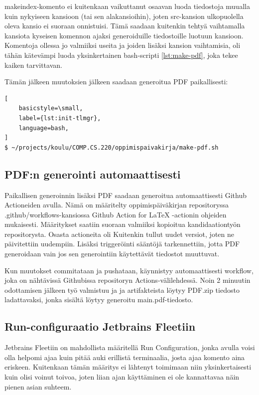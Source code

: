 makeindex-komento ei kuitenkaan vaikuttanut osaavan luoda tiedostoja muualla
kuin nykyiseen kansioon (tai sen alakansioihin), joten src-kansion ulkopuolella
oleva kansio ei suoraan onnistuisi. Tämä saadaan kuitenkin tehtyä vaihtamalla
kansiota kyseisen komennon ajaksi generoiduille tiedostoille luotuun kansioon.
Komentoja ollessa jo valmiiksi useita ja joiden lisäksi kansion vaihtamisia,
oli tähän kätevämpi luoda yksinkertainen bash-scripti \ref{lst:make-pdf}, joka
tekee kaiken tarvittavan.



Tämän jälkeen muutoksien jälkeen saadaan generoitua PDF paikallisesti:

\begin{lstlisting}[
    basicstyle=\small,
    label={lst:init-tlmgr},
    language=bash,
]
$ ~/projects/koulu/COMP.CS.220/oppimispaivakirja/make-pdf.sh
\end{lstlisting}

\subsection{PDF:n generointi automaattisesti}

Paikallisen generoinnin lisäksi PDF saadaan generoitua automaattisesti Github
Actioneiden avulla. Nämä on määritelty oppimispäiväkirjan repositoryssa
.github/workflows-kansiossa Github Action for LaTeX -actionin ohjeiden
\parencite{GithubActionsForLaTeX} mukaisesti. Määritykset saatiin suoraan
valmiiksi kopioitua kandidaationtyön repositorysta. Osasta actioneita oli
Kuitenkin tullut uudet versiot, joten ne päivitettiin uudempiin. Lisäksi
triggeröinti sääntöjä tarkennettiin, jotta PDF generoidaan vain jos sen
generointiin käytettävät tiedostot muuttuvat.

Kun muutokset commitataan ja pushataan, käynnistyy automaattisesti workflow,
joka on nähtävissä Githubissa repositoryn Actions-välilehdessä. Noin 2 minuutin
odottamisen jälkeen työ valmistuu ja ja artifakteista löytyy PDF.zip tiedosto
ladattavaksi, jonka sisältä löytyy generoitu main.pdf-tiedosto.

\subsection{Run-configuraatio Jetbrains Fleetiin}

Jetbrains Fleetiin on mahdollista määritellä Run Configuration, jonka avulla
voisi olla helpomi ajaa kuin pitää auki erillistä terminaalia, josta ajaa
komento aina eriskeen. Kuitenkaan tämän määritys ei lähtenyt toimimaan niin
yksinkertaisesti kuin olisi voinut toivoa, joten liian ajan käyttäminen ei
ole kannattavaa näin pienen asian suhteem.

